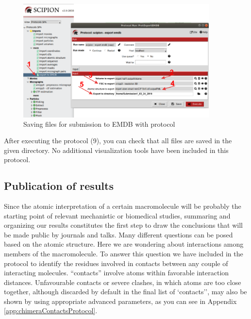  \begin{figure}[H]
  \centering 
  \captionsetup{width=.9\linewidth} 
  \includegraphics[width=0.9\textwidth]{Images/Fig45}
  \caption{Saving files for submission to EMDB with protocol }
  \label{fig:export_to_EMDB_protocol}
  \end{figure}
  
After executing the protocol (9), you can check that all files are saved in the given directory. No additional visualization tools have been included in this protocol. 

\subsection*{Publication of results}

Since the atomic interpretation of a certain macromolecule will be probably the starting point of relevant mechanistic or biomedical studies, summaring and organizing our results constitutes the first step to draw the conclusions that will be made public by journals and talks. Many different questions can be posed based on the atomic structure. Here we are wondering about interactions among members of the macromolecule. To answer this question we have included in \scipion the protocol  to identify the residues involved in contacts between any couple of interacting molecules. ``contacts'' involve atoms within  favorable interaction distances. Unfavourable contacts or severe clashes, in which atoms are too close together, although discarded by default in the final list of `contacts'', may also be shown by using appropriate advanced parameters, as you can see in Appendix \ref{app:chimeraContactsProtocol}. \\

